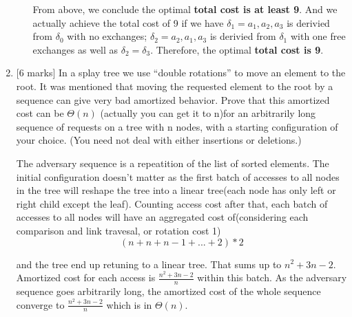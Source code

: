 \documentclass[12pt]{article}
\begin{document}
\begin{enumerate}
\begin{itemize}
From above, we conclude the optimal \textbf{total cost is at least 9}.  And we actually achieve the total cost of 9 if we have $\delta_{1} = a_{1},a_{2},a_{3}$ is derivied from $\delta_{0}$ with no exchanges;  $\delta_{2} = a_{2},a_{1},a_{3}$ is derivied from $\delta_{1}$ with one free exchanges as well as $\delta_{2} = \delta_{3}$. Therefore, the optimal \textbf{total cost is 9}.

\end{itemize}

\medskip

\item{} [6 marks]
In a splay tree we use “double rotations” to move an element to the root. It was mentioned that moving the requested element to the root by a sequence can give very bad amortized behavior. Prove that this amortized cost can be $\Theta(n)$ (actually you can get it to n)for an arbitrarily long sequence of requests on a tree with n nodes, with a starting configuration of your choice. (You need not deal with either insertions or deletions.)

The adversary sequence is a repeatition of the list of sorted elements. The initial configuration doesn't matter as the first batch of accesses to all nodes in the tree will reshape the tree into a linear tree(each node has only left or right child except the leaf). Counting access cost after that, each batch of accesses to all nodes will have an aggregated cost of(considering each comparison and link travesal, or rotation cost 1)
\begin{equation}
(n + n + n - 1 + ... + 2) * 2
\end{equation}

and the tree end up retuning to a linear tree. That sums up to $n^{2} + 3n - 2$. Amortized cost for each access is $\frac{n^{2} + 3n - 2}{n}$ within this batch. As the adversary sequence goes arbitrarily long, the amortized cost of the whole sequence converge to $\frac{n^{2} + 3n - 2}{n}$ which is in $\Theta(n)$.

\end{enumerate}
\end{document}
